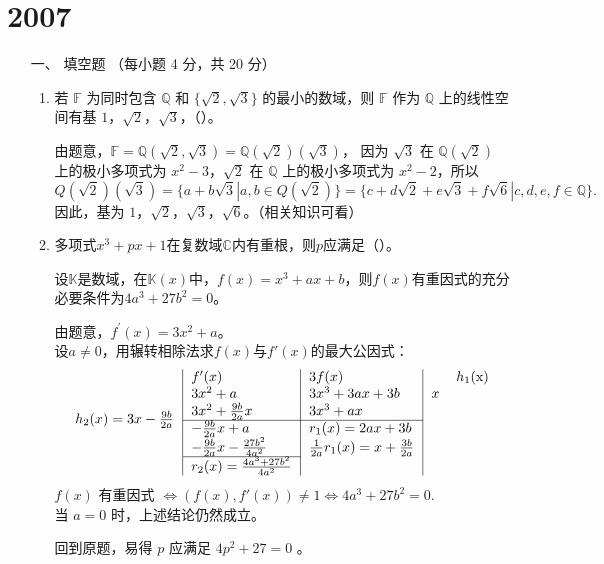 \section{2007}
\begin{enumerate}[1~]
\renewcommand{\labelenumi}{\textbf{\theenumi. }}
\renewcommand{\Im}{\text{Im }}
\item[一、]
填空题 （每小题 4 分，共 20 分）
\begin{enumerate}[1.~]
\item
若 $\mathbb{F}$ 为同时包含 $\mathbb{Q}$ 和 $\{\sqrt{2}, \sqrt{3}\}$ 的最小的数域，则 $\mathbb{F}$ 作为 $\mathbb{Q}$ 上的线性空间有基 $1$，$\sqrt{2}$，$\sqrt{3}$，（\quad）。
\begin{solution}
由题意，$\mathbb{F} = \mathbb{Q}(\sqrt{2}, \sqrt{3}) = \mathbb{Q}(\sqrt{2})(\sqrt{3})$，
因为 $\sqrt{3}$ 在 $\mathbb{Q}(\sqrt{2})$ 上的极小多项式为 $x^2 - 3$，$\sqrt{2}$ 在 $\mathbb{Q}$ 上的极小多项式为 $x^2 - 2$，所以 \[
Q(\sqrt{2})(\sqrt{3}) = \{a + b\sqrt{3}| a, b \in Q(\sqrt{2})\} = \{c + d\sqrt{2} + e \sqrt{3} + f\sqrt{6}| c, d, e, f \in \mathbb{Q}\}.
\]
因此，基为 $1$，$\sqrt{2}$，$\sqrt{3}$，$\sqrt{6}$。（相关知识可看\cite{qiujin}）
\end{solution}

\item
多项式$x^3+px+1$在复数域$\mathbb{C}$内有重根，则$p$应满足（\quad）。
\begin{solution}
\begin{lemma}
设$\mathbb{K}$是数域，在$\mathbb{K}(x)$中，$f(x)=x^3+ax+b$，则$f(x)$有重因式的充分必要条件为$4a^3+27b^2=0$。
\end{lemma}
\begin{subproof}
由题意，$f ^ { \prime } ( x ) = 3 x ^ { 2 } + a$。\\
设$a\ne0$，用辗转相除法求$f(x)$与$f'(x)$的最大公因式：
\[
\begin{tabular}{l|l|l|ll}
\multirow{6}{*}{$h_2(x)=3x-\frac{9b}{2a}$} & $f'(x)$ & $3f(x)$ &  & $h_1$(x) \\ 
 & $3x^2+a$ & $3x^3+3ax+3b$ & $x$ &  \\
 & $3x^2+\frac{9b}{2a}x$ & $3x^3+ax$ &  &  \\ 
 \cline{2-3}
 & $-\frac{9b}{2a}x+a$ & $r_1(x)=2ax+3b$ &  &  \\
 & $-\frac{9b}{2a}x-\frac{27b^2}{4a^2}$ & $\frac{1}{2a}r_1(x)=x+\frac{3b}{2a}$ &  &  \\
 \cline{2-2}
 & $r_2(x)=\frac{4a^3+27b^2}{4a^2}$ &  &  & 
\end{tabular}
\]
$f(x)$ 有重因式 $\Longleftrightarrow (f(x), f'(x))\ne 1\Longleftrightarrow 4a^3+27b^2=0.$\\
当 $a=0$ 时，上述结论仍然成立。
\end{subproof}
回到原题，易得 $p$ 应满足 $4p^2+27=0$ 。
\end{solution}



\end{enumerate}
\end{enumerate}
